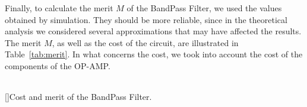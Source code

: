 \vspace{10mm}

Finally, to calculate the merit $M$ of the BandPass Filter, we used the values obtained by simulation. They should be more reliable, since in the theoretical analysis we considered several approximations that may have affected the results. The merit $M$, as well as the cost of the circuit, are illustrated in Table~\ref{tab:merit}. In what concerns the cost, we took into account the cost of the components of the OP-AMP.

\vspace{2mm}

\begin{center}
\begin{tabular}{ | c | c | }\hline
 
\end{tabular}
[]{Cost and merit of the BandPass Filter.}
\label{tab:merit}
\end{center}
